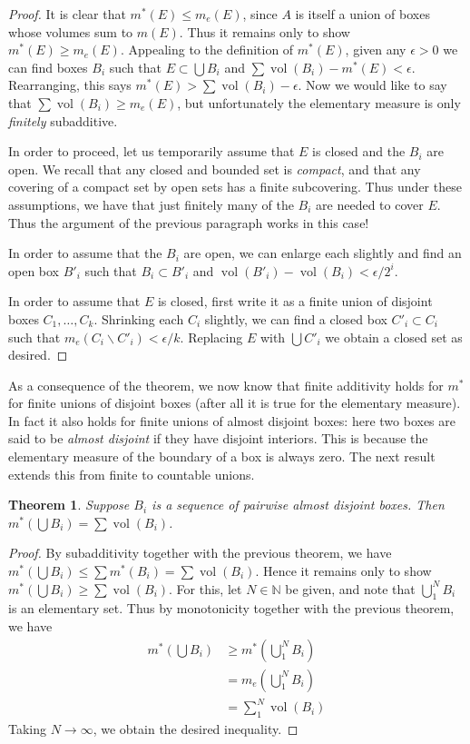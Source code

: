 \documentclass[11pt,oneside]{amsbook}
\renewcommand{\setminus}{\smallsetminus}
\newcommand{\NN}{{\mathbb N}}
\DeclareMathOperator{\vol}{vol}
\theoremstyle{definition}
\theoremstyle{plain}
\newtheorem{thm}{Theorem}[section]
\theoremstyle{definition}
\theoremstyle{remark}
\numberwithin{equation}{section}
\numberwithin{figure}{section}
\begin{document}
\begin{proof}
  It is clear that $m^*(E)\leq m_e(E)$, since $A$ is itself a union of boxes whose volumes sum to $m(E)$. Thus it remains only to show $m^*(E)\geq m_e(E)$. Appealing to the definition of $m^*(E)$, given any $\epsilon>0$ we can find boxes $B_i$ such that $E\subset\bigcup B_i$ and $\sum\vol(B_i)-m^*(E)<\epsilon$. Rearranging, this says $m^*(E)>\sum\vol(B_i)-\epsilon$. Now we would like to say that $\sum\vol(B_i)\geq m_e(E)$, but unfortunately the elementary measure is only \emph{finitely} subadditive.

  In order to proceed, let us temporarily assume that $E$ is closed and the $B_i$ are open. We recall that any closed and bounded set is \emph{compact}, and that any covering of a compact set by open sets has a finite subcovering. Thus under these assumptions, we have that just finitely many of the $B_i$ are needed to cover $E$. Thus the argument of the previous paragraph works in this case!

  In order to assume that the $B_i$ are open, we can enlarge each slightly and find an open box $B'_i$ such that $B_i\subset B'_i$ and $\vol(B'_i)-\vol(B_i)<\epsilon/2^i$.

  In order to assume that $E$ is closed, first write it as a finite union of disjoint boxes $C_1,\ldots,C_k$. Shrinking each $C_i$ slightly, we can find a closed box $C'_i\subset C_i$ such that $m_e(C_i\setminus C'_i)<\epsilon/k$. Replacing $E$ with $\bigcup C'_i$ we obtain a closed set as desired.
\end{proof}

As a consequence of the theorem, we now know that finite additivity holds for $m^*$ for finite unions of disjoint boxes (after all it is true for the elementary measure). In fact it also holds for finite unions of almost disjoint boxes: here two boxes are said to be \emph{almost disjoint} if they have disjoint interiors. This is because the elementary measure of the boundary of a box is always zero. The next result extends this from finite to countable unions.

\begin{thm}
  Suppose $B_i$ is a sequence of pairwise almost disjoint boxes. Then $m^*(\bigcup B_i)=\sum\vol(B_i)$.
\end{thm}

\begin{proof}
  By subadditivity together with the previous theorem, we have $m^*(\bigcup B_i)\leq\sum m^*(B_i)=\sum\vol(B_i)$. Hence it remains only to show $m^*(\bigcup B_i)\geq\sum\vol(B_i)$. For this, let $N\in\NN$ be given, and note that $\bigcup_1^NB_i$ is an elementary set. Thus by monotonicity together with the previous theorem, we have
  \begin{align*}
    m^*(\bigcup B_i)&\geq m^*(\bigcup_1^NB_i)\\
                    &=m_e(\bigcup_1^NB_i)\\
                    &=\sum_1^N\vol(B_i)
  \end{align*}
  Taking $N\to\infty$, we obtain the desired inequality.
\end{proof}
\end{document}
